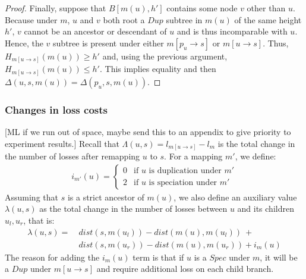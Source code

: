 \documentclass[10pt]{article}
\newcommand{\ml}[1]{\begingroup\color{blue}#1\endgroup}
\begin{document}
\begin{proof}
    Finally, suppose that $B[m(u), h']$ contains some node $v$ other than $u$.
    Because under $m$, $u$ and $v$ both root a $Dup$ subtree in $m(u)$ of the same height $h'$, $v$ cannot be an ancestor or descendant of $u$ and is thus incomparable with $u$.  Hence, the $v$ subtree is present under either $m[p_u \rightarrow s]$ or $m[u \rightarrow s]$. 
    Thus, $H_{m[u \rightarrow s]}(m(u)) \geq h'$ and, using the previous argument, $H_{m[u \rightarrow s]}(m(u)) \leq h'$.  This implies equality and then $\Delta(u, s, m(u)) = \Delta(p_u, s, m(u))$.
\end{proof}






\subsubsection{Changes in loss costs}

\ml{[ML if we run out of space, maybe send this to an appendix to give priority to experiment results.]}
Recall that $\Lambda(u, s) = l_{m[u \rightarrow s]} - l_m$ is the total change in the number of losses after remapping $u$ to $s$. 
For a mapping $m'$, we define:
        \begin{align*}
            i_{m'}(u) = \begin{cases}
                0 &\mbox{if  $u$ is duplication under $m'$} \\
                2 &\mbox{if  $u$ is speciation under $m'$}
            \end{cases}
        \end{align*}
Assuming that $s$ is a strict ancestor of $m(u)$, we also define an auxiliary value  $\lambda(u,s)$ as the total change in the number of losses between $u$ and its children $u_l, u_r$, that is:
    \begin{align*}
    \lambda(u, s) =~&dist(s , m(u_l))  - dist(m(u), m(u_l))~+ \\
    &dist(s , m(u_r)) -  dist(m(u), m(u_r)) + i_m(u)
    \end{align*}
The reason for adding the $i_m(u)$ term is that if $u$ is a $Spec$ under $m$, it will be a $Dup$ under $m[u \rightarrow s]$ and require additional loss on each child branch.
\end{document}

